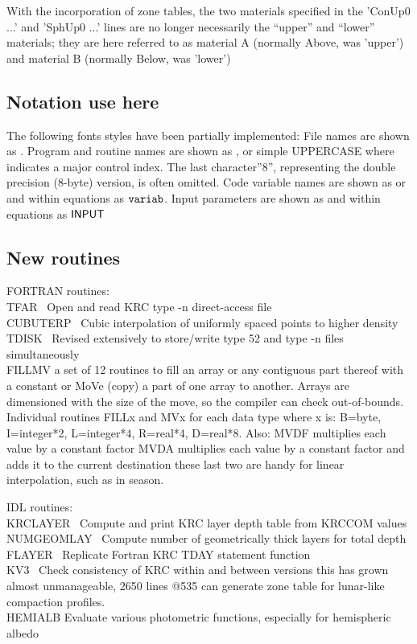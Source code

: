 \documentclass{article}
\begin{document}
With the incorporation of zone tables, the two materials specified in the
'ConUp0 ...' and 'SphUp0 ...' lines are no longer necessarily the ``upper'' and
``lower'' materials; they are here referred to as material A (normally Above,
was 'upper') and material B (normally Below, was 'lower')

\subsection{Notation use here}
The following fonts styles have been partially implemented: 
\qi File names are shown as . 
\qi Program and routine names are shown as  , or simple UPPERCASE
\qii where  indicates a major control index.
\qii The last character''8'', representing the double precision (8-byte) version, is often omitted. 
\qi Code variable names are shown as  or   and within equations as $\mathtt{variab}$.  
\qi Input parameters are shown as  and within equations as $\mathsf{INPUT}$


\subsection{New routines}
FORTRAN routines:
\\ TFAR \ Open and read KRC type -n direct-access file
\\ CUBUTERP \ Cubic interpolation of uniformly spaced points to higher density
\\  TDISK \ Revised extensively to store/write type 52 and type -n files simultaneously 
\\ FILLMV a set of 12 routines to fill an array or any contiguous part thereof
with a constant or MoVe (copy) a part of one array to another. Arrays are
dimensioned with the size of the move, so the compiler can check
out-of-bounds. Individual routines FILLx and MVx for each data type where x is:
B=byte, I=integer*2, L=integer*4, R=real*4, D=real*8.  Also:
\qi MVDF multiplies each value by a constant factor
\qi MVDA multiplies each value by a constant factor and adds it to the current destination
\qii these last two are handy for linear interpolation, such as in season.

IDL routines:
\\ KRCLAYER \ Compute and print KRC layer depth table from KRCCOM values
\\  NUMGEOMLAY \ Compute number of geometrically thick layers for total depth
\\  FLAYER \ Replicate Fortran KRC TDAY statement function
\\  KV3 \ Check consistency of KRC within and between versions
\qii this has grown almost unmanageable, 2650 lines
\qiii @535 can generate zone table for lunar-like compaction profiles.
\\ HEMIALB Evaluate various photometric functions, especially for hemispheric albedo
\end{document}
